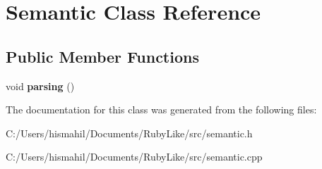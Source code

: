 \hypertarget{class_semantic}{\section{Semantic Class Reference}
\label{class_semantic}
}
\subsection*{Public Member Functions}
\begin{DoxyCompactItemize}
\item 
\hypertarget{class_semantic_a2f5269187e39b421d64a62ba500d1d31}{void {\bfseries parsing} ()}\label{class_semantic_a2f5269187e39b421d64a62ba500d1d31}

\end{DoxyCompactItemize}


The documentation for this class was generated from the following files\-:\begin{DoxyCompactItemize}
\item 
C\-:/\-Users/hismahil/\-Documents/\-Ruby\-Like/src/semantic.\-h\item 
C\-:/\-Users/hismahil/\-Documents/\-Ruby\-Like/src/semantic.\-cpp\end{DoxyCompactItemize}
